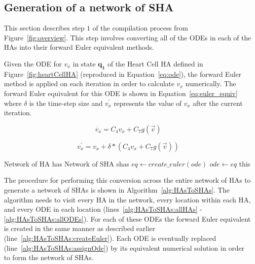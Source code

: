 \subsection{Generation of a network of \ac{SHA}}
\label{sec:shaGeneration}

This section describes step $1$ of the compilation process from Figure~\ref{fig:overview}.
This step involves converting all of the \acp{ODE} in each of the \acp{HA} into their forward Euler equivalent methods.

Given the \ac{ODE} for $v_x$ in state $\mathbf{q_1}$ of the Heart Cell \ac{HA} defined in Figure~\ref{fig:heartCellHA} (reproduced in Equation~\ref{eq:ode}), the forward Euler method is applied on each iteration in order to calculate $v_x$ numerically.
The forward Euler equivalent for this ODE is shown in Equation~\ref{eq:euler_equiv} where $\delta$ is the time-step size and $v^\prime_x$ represents the value of $v_x$ after the current iteration.

\begin{equation}
\dot{v_x} = C_{4} v_x + C_{7} g(\vec{v})
\label{eq:ode}
\end{equation}

\begin{equation}
v^\prime_x = v_x + \delta * (C_{4} v_x + C_{7} g(\vec{v}))
\label{eq:euler_equiv}
\end{equation}

\renewcommand{\algorithmiccomment}[1]{// #1}
\renewcommand{\algorithmicrequire}{\textbf{Input:}}
\renewcommand{\algorithmicensure}{\textbf{Output:}}
\begin{algorithm}[t!]
	\begin{algorithmic}[1]
		\REQUIRE Network of HA has 
		\ENSURE Network of SHA shas
		 \label{alg:HAsToSHAs:allHAs}
		  \label{alg:HAsToSHAs:allLocs}
		 \label{alg:HAsToSHAs:allODEs}
		\STATE $eq \leftarrow create\_euler(ode)$ \label{alg:HAsToSHAs:createEuler}
		\STATE $ode \leftarrow eq$ \label{alg:HAsToSHAs:assignOde}
		\ENDFOR
		\ENDFOR
		\ENDFOR
		\RETURN this
	\end{algorithmic}
	\caption{The algorithm to generate a Network of \acp{SHA} from a Network of \acp{HA}}
	\label{alg:HAsToSHAs}
\end{algorithm}

The procedure for performing this conversion across the entire network of \acp{HA} to generate a network of \acp{SHA} is shown in Algorithm~\ref{alg:HAsToSHAs}.
The algorithm needs to visit every \ac{HA} in the network, every location within each \ac{HA}, and every \ac{ODE} in each location (lines~\ref{alg:HAsToSHAs:allHAs} - \ref{alg:HAsToSHAs:allODEs}).
For each of these \acp{ODE} the forward Euler equivalent is created in the same manner as described earlier (line~\ref{alg:HAsToSHAs:createEuler}).
Each \ac{ODE} is eventually replaced (line~\ref{alg:HAsToSHAs:assignOde}) by its equivalent numerical solution in order to form the network of \acp{SHA}.

